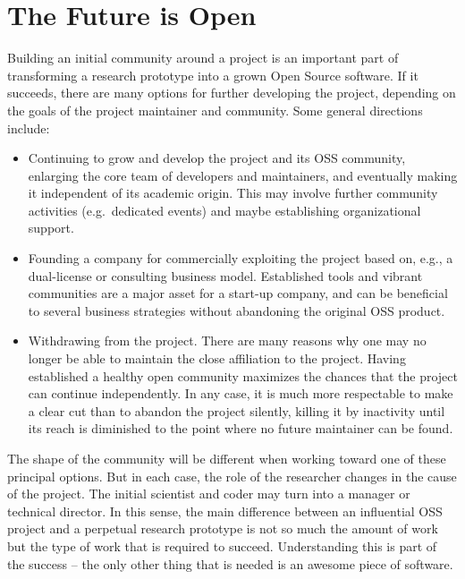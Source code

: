 \section*{The Future is Open}

Building an initial community around a project is an important part of
transforming a research prototype into a grown Open Source software. If it
succeeds, there are many options for further developing the project, depending
on the goals of the project maintainer and community. Some general directions
include:
%
\begin{itemize}
\item Continuing to grow and develop the project and its OSS community,
enlarging the core team of developers and maintainers, and eventually making it
independent of its academic origin. This may involve further community
activities (e.g.\ dedicated events) and maybe establishing organizational
support.
%
\item Founding a company for commercially exploiting the project based on, e.g.,
a dual-license or consulting business model. Established tools and vibrant
communities are a major asset for a start-up company, and can be beneficial to
several business strategies without abandoning the original OSS product.
%
\item Withdrawing from the project. There are many reasons why one may no longer
be able to maintain the close affiliation to the project. Having established a
healthy open community maximizes the chances that the project can continue
independently. In any case, it is much more respectable to make a clear cut than
to abandon the project silently, killing it by inactivity until its reach is
diminished to the point where no future maintainer can be found.
\end{itemize}
%
The shape of the community will be different when working toward one of these
principal options. But in each case, the role of the researcher changes in the
cause of the project. The initial scientist and coder may turn into a manager or
technical director. In this sense, the main difference between an influential
OSS project and a perpetual research prototype is not so much the amount of work
but the type of work that is required to succeed. Understanding this is part of
the success -- the only other thing that is needed is an awesome piece of
software.
